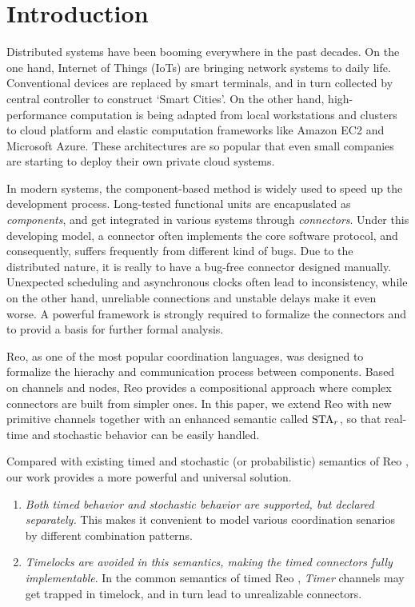 \section{Introduction}
\label{sec:intro}

Distributed systems have been booming everywhere in the past decades. On the one hand, Internet of Things (IoTs) are bringing network systems to daily life. Conventional devices are replaced by smart terminals, and in turn collected by central controller to construct `Smart Cities'. On the other hand, high-performance computation is being adapted from local workstations and clusters to cloud platform and elastic computation frameworks like Amazon EC2\cite{Newcombe2015} and Microsoft Azure\cite{Li2009}. These architectures are so popular that even small companies are starting to deploy their own private cloud systems. 

In modern systems, the component-based method is widely used to speed up the development process. Long-tested functional units are encapuslated as \emph{components}, and get integrated in various systems through \emph{connectors}. Under this developing model, a connector often implements the core software protocol, and consequently, suffers frequently from different kind of bugs.
Due to the distributed nature, it is really to have a bug-free connector designed manually. Unexpected scheduling and asynchronous clocks often lead to inconsistency, while on the other hand, unreliable connections and unstable delays make it even worse. A powerful framework is strongly required to formalize the connectors and to provid a basis for further formal analysis.

Reo\cite{ARBAB2004}, as one of the most popular coordination languages, was designed to formalize the hierachy and communication process between components. Based on channels and nodes, Reo provides a compositional approach where complex connectors are built from simpler ones.
In this paper, we extend Reo with new primitive channels together with an enhanced semantic called $\mbox{STA}_r$, so that real-time and stochastic behavior can be easily handled.

Compared with existing timed and stochastic (or probabilistic) semantics of Reo \cite{Meng2012,Meng2007,Baier2006,Arbab2009}, our work provides a more powerful and universal solution. 
\begin{enumerate}
    \item \emph{Both timed behavior and stochastic behavior are supported, but declared separately.} This makes it convenient to model various coordination senarios by different combination patterns.
    \item \emph{Timelocks are avoided in this semantics, making the timed connectors fully implementable}. In the common semantics of timed Reo \cite{Arbab2006,Meng2012}, \emph{Timer} channels may get trapped in timelock, and in turn lead to unrealizable connectors.
\end{enumerate}

